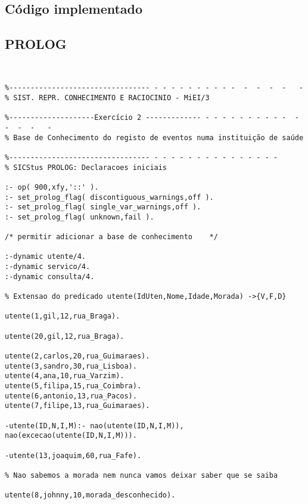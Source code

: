 \documentclass[pdftex,12pt,a4paper]{report}
\begin{document}


\tableofcontents
\listoffigures 





\begin{appendices}
	\chapter{Código implementado}
	\section{PROLOG}
	
	
	
\begin{verbatim}


%--------------------------------- - - - - - - - - - -  -  -  -  -   -
% SIST. REPR. CONHECIMENTO E RACIOCINIO - MiEI/3

%--------------------Exercício 2 ------------- - - - - - - - - - -  -  -  -  -   -
% Base de Conhecimento do registo de eventos numa instituição de saúde

%--------------------------------- - - - - - - - - - - - - - - -
% SICStus PROLOG: Declaracoes iniciais

:- op( 900,xfy,'::' ).
:- set_prolog_flag( discontiguous_warnings,off ).
:- set_prolog_flag( single_var_warnings,off ).
:- set_prolog_flag( unknown,fail ).

/* permitir adicionar a base de conhecimento	*/

:-dynamic utente/4.
:-dynamic servico/4.
:-dynamic consulta/4.

% Extensao do predicado utente(IdUten,Nome,Idade,Morada) ->{V,F,D}

utente(1,gil,12,rua_Braga).

utente(20,gil,12,rua_Braga).

utente(2,carlos,20,rua_Guimaraes).
utente(3,sandro,30,rua_Lisboa).
utente(4,ana,10,rua_Varzim).
utente(5,filipa,15,rua_Coimbra).
utente(6,antonio,13,rua_Pacos).
utente(7,filipe,13,rua_Guimaraes).

-utente(ID,N,I,M):- nao(utente(ID,N,I,M)),
nao(excecao(utente(ID,N,I,M))).

-utente(13,joaquim,60,rua_Fafe).

% Nao sabemos a morada nem nunca vamos deixar saber que se saiba

utente(8,johnny,10,morada_desconhecido).


\end{verbatim}
\end{appendices}
\end{document}

